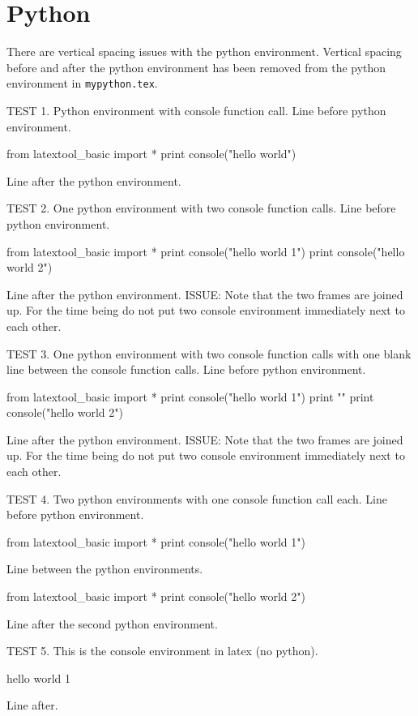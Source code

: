 \section{Python}

There are vertical spacing issues with the python environment.
Vertical spacing before and after the python environment has been removed
from the python environment in \verb!mypython.tex!.

TEST 1.
Python environment with console function call.
Line before python environment.
\begin{python}
from latextool_basic import *
print console("hello world")
\end{python}
Line after the python environment.

TEST 2.
One python environment with two console function calls.
Line before python environment.
\begin{python}
from latextool_basic import *
print console("hello world 1")
print console("hello world 2")
\end{python}
Line after the python environment.
ISSUE: Note that the two frames are joined up.
For the time being do not put two console environment 
immediately next to each other.

\newpage

TEST 3.
One python environment with two console function calls with
one blank line between the console function calls.
Line before python environment.
\begin{python}
from latextool_basic import *
print console("hello world 1")
print ""
print console("hello world 2")
\end{python}
Line after the python environment.
ISSUE: Note that the two frames are joined up.
For the time being do not put two console environment 
immediately next to each other.

TEST 4.
Two python environments with one console function call each.
Line before python environment.
\begin{python}
from latextool_basic import *
print console("hello world 1")
\end{python}
Line between the python environments.
\begin{python}
from latextool_basic import *
print console("hello world 2")
\end{python}
Line after the second python environment.

TEST 5. This is the console environment in latex (no python).
\begin{console}
hello world 1
\end{console}
Line after.

